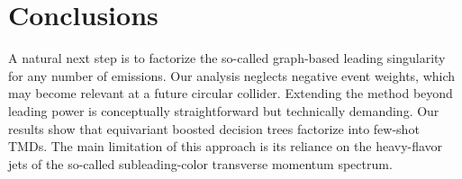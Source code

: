 \section{Conclusions}\label{sec:conclusions}

A natural next step is to factorize the so-called graph-based leading
singularity for any number of emissions. Our analysis neglects negative
event weights, which may become relevant at a future circular collider.
Extending the method beyond leading power is conceptually
straightforward but technically demanding. Our results show that
equivariant boosted decision trees factorize into few-shot TMDs. The
main limitation of this approach is its reliance on the heavy-flavor
jets of the so-called subleading-color transverse momentum spectrum.

